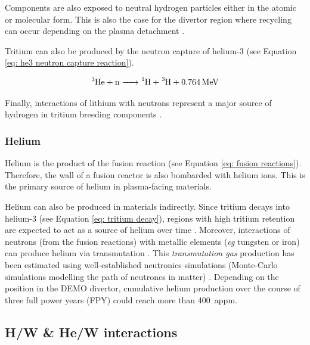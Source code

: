 Components are also exposed to neutral hydrogen particles either in the atomic or molecular form.
This is also the case for the divertor region where recycling can occur depending on the plasma detachment .

Tritium can also be produced by the neutron capture of helium-3  (see Equation \ref{eq: he3 neutron capture reaction}).

\begin{equation}
    \ce{^3He + n -> ^1H + ^3H + \SI{0.764}{MeV}}
    \label{eq: he3 neutron capture reaction}
\end{equation}

Finally, interactions of lithium with neutrons represent a major source of hydrogen in tritium breeding components .

\subsubsection{Helium}
Helium is the product of the fusion reaction (see Equation \ref{eq: fusion reactions}).
Therefore, the wall of a fusion reactor is also bombarded with helium ions.
This is the primary source of helium in plasma-facing materials.

Helium can also be produced in materials indirectly.
Since tritium decays into helium-3 (see Equation \ref{eq: tritium decay}), regions with high tritium retention are expected to act as a source of helium over time \cite{shimada_tritium_2017}.
Moreover, interactions of neutrons (from the fusion reactions) with metallic elements (\textit{eg} tungsten or iron) can produce helium via transmutation .
This \textit{transmutation gas} production has been estimated using well-established neutronics simulations (Monte-Carlo simulations modelling the path of neutroncs in matter) .
Depending on the position in the DEMO divertor, cumulative helium production over the course of three full power years (FPY) could reach more than \SI{400}{appm}.


\subsection{H/W \& He/W interactions}


